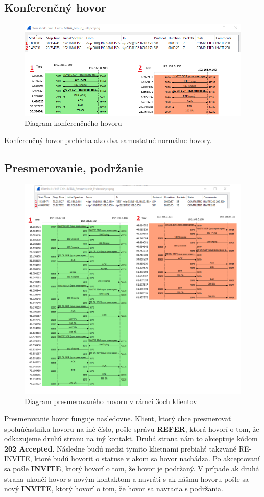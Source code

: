 \documentclass[10pt,oneside,slovak,a4paper]{article}
\begin{document}
\subsection{Konferenčný hovor}
\begin{figure}[H]
	\centering
	\includegraphics[scale=1, width=\textwidth]{Group.png}
	\caption{Diagram konferenčného hovoru}
\end{figure}
Konferenčný hovor prebieha ako dva samostatné normálne hovory. 
\subsection{Presmerovanie, podržanie}
\begin{figure}[H]
	\centering
	\includegraphics[scale=1, width=\textwidth]{ForwardHold.png}
	\caption{Diagram presmerovaného hovoru v rámci 3och klientov}
\end{figure}
Presmerovanie hovor funguje nasledovne. Klient, ktorý chce presmerovať spoluúčastníka hovoru na iné číslo, pošle správu \textbf{REFER}, ktorá hovorí o tom, že odkazujeme druhú stranu na iný kontakt. Druhá strana nám to akceptuje kódom \textbf{202 Accepted}. Následne budú medzi tymito klietnami prebiahť takzvané RE-INVITE, ktoré budú hovoriť o statuse v akom sa hovor nachádza. Po akceptovaní sa pošle \textbf{INVITE}, ktorý hovorí o tom, že hovor je podržaný. V prípade ak druhá strana ukončí hovor s novým kontaktom a navráti s ak nášmu hovoru pošle sa nový \textbf{INVITE}, ktorý hovorí o tom, že hovor sa navracia s podržania. 
\end{document}
